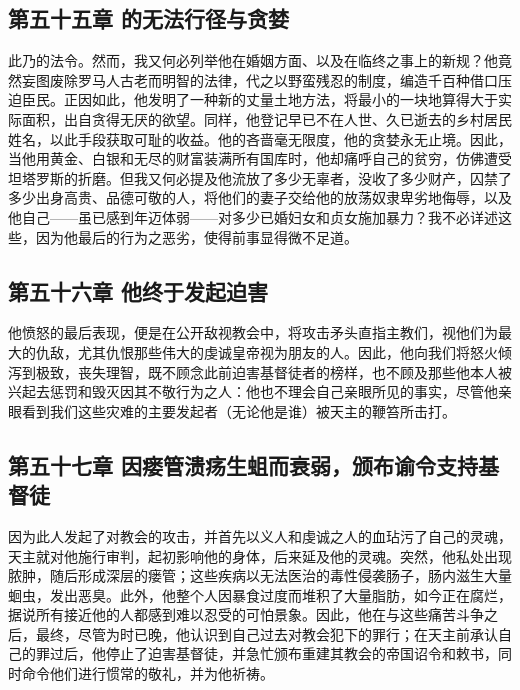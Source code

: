 
\subsection{第五十五章 的无法行径与贪婪}

此乃的法令。然而，我又何必列举他在婚姻方面、以及在临终之事上的新规？他竟然妄图废除罗马人古老而明智的法律，代之以野蛮残忍的制度，编造千百种借口压迫臣民。正因如此，他发明了一种新的丈量土地方法，将最小的一块地算得大于实际面积，出自贪得无厌的欲望。同样，他登记早已不在人世、久已逝去的乡村居民姓名，以此手段获取可耻的收益。他的吝啬毫无限度，他的贪婪永无止境。因此，当他用黄金、白银和无尽的财富装满所有国库时，他却痛呼自己的贫穷，仿佛遭受坦塔罗斯的折磨。但我又何必提及他流放了多少无辜者，没收了多少财产，囚禁了多少出身高贵、品德可敬的人，将他们的妻子交给他的放荡奴隶卑劣地侮辱，以及他自己——虽已感到年迈体弱——对多少已婚妇女和贞女施加暴力？我不必详述这些，因为他最后的行为之恶劣，使得前事显得微不足道。\par


\subsection{第五十六章 他终于发起迫害}

他愤怒的最后表现，便是在公开敌视教会中，将攻击矛头直指主教们，视他们为最大的仇敌，尤其仇恨那些伟大的虔诚皇帝视为朋友的人。因此，他向我们将怒火倾泻到极致，丧失理智，既不顾念此前迫害基督徒者的榜样，也不顾及那些他本人被兴起去惩罚和毁灭因其不敬行为之人：他也不理会自己亲眼所见的事实，尽管他亲眼看到我们这些灾难的主要发起者（无论他是谁）被天主的鞭笞所击打。\par


\subsection{第五十七章 因瘘管溃疡生蛆而衰弱，颁布谕令支持基督徒}

因为此人发起了对教会的攻击，并首先以义人和虔诚之人的血玷污了自己的灵魂，天主就对他施行审判，起初影响他的身体，后来延及他的灵魂。突然，他私处出现脓肿，随后形成深层的瘘管；这些疾病以无法医治的毒性侵袭肠子，肠内滋生大量蛔虫，发出恶臭。此外，他整个人因暴食过度而堆积了大量脂肪，如今正在腐烂，据说所有接近他的人都感到难以忍受的可怕景象。因此，他在与这些痛苦斗争之后，最终，尽管为时已晚，他认识到自己过去对教会犯下的罪行；在天主前承认自己的罪过后，他停止了迫害基督徒，并急忙颁布重建其教会的帝国诏令和敕书，同时命令他们进行惯常的敬礼，并为他祈祷。\par

